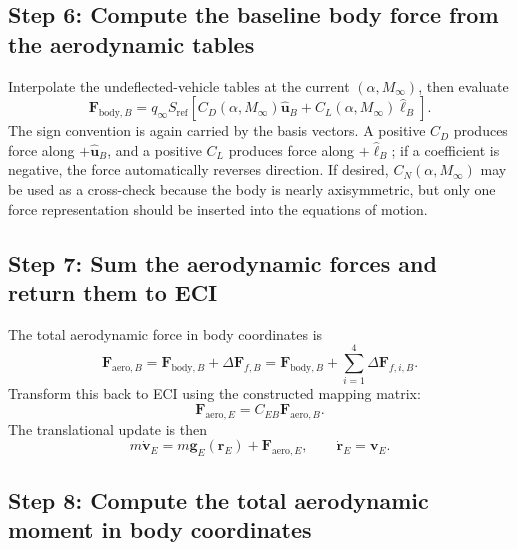 \subsection{Step 6: Compute the baseline body force from the aerodynamic tables}

Interpolate the undeflected-vehicle tables at the current \((\alpha,M_\infty)\), then evaluate
\begin{equation}
\mathbf F_{\mathrm{body},B}
=
q_\infty S_{\mathrm{ref}}
\left[
C_D(\alpha,M_\infty)\hat{\mathbf u}_B
+
C_L(\alpha,M_\infty)\hat{\boldsymbol\ell}_B
\right]. \label{eq:step6_body_force}
\end{equation}
The sign convention is again carried by the basis vectors. A positive \(C_D\) produces force along \(+\hat{\mathbf u}_B\), and a positive \(C_L\) produces force along \(+\hat{\boldsymbol\ell}_B\); if a coefficient is negative, the force automatically reverses direction. If desired, \(C_N(\alpha,M_\infty)\) may be used as a cross-check because the body is nearly axisymmetric, but only one force representation should be inserted into the equations of motion.

\subsection{Step 7: Sum the aerodynamic forces and return them to ECI}

The total aerodynamic force in body coordinates is
\begin{equation}
\mathbf F_{\mathrm{aero},B}
=
\mathbf F_{\mathrm{body},B}
+
\Delta\mathbf F_{f,B}
=
\mathbf F_{\mathrm{body},B}
+
\sum_{i=1}^4 \Delta\mathbf F_{f,i,B}. \label{eq:total_aero_force_b}
\end{equation}
Transform this back to ECI using the constructed mapping matrix:
\begin{equation}
\mathbf F_{\mathrm{aero},E}
=
C_{EB}\mathbf F_{\mathrm{aero},B}. \label{eq:total_aero_force_e}
\end{equation}
The translational update is then
\begin{equation}
m\dot{\mathbf v}_E
=
m\mathbf g_E(\mathbf r_E)+\mathbf F_{\mathrm{aero},E},
\qquad
\dot{\mathbf r}_E=\mathbf v_E.
\end{equation}

\subsection{Step 8: Compute the total aerodynamic moment in body coordinates}

